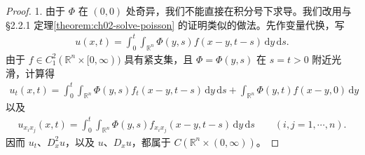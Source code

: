 \documentclass[../../main.tex]{subfiles}
\begin{document}
\begin{proof}
1. 由于 $\Phi$ 在 $(0,0)$ 处奇异，我们不能直接在积分号下求导。我们改用与 \S2.2.1 定理\cref{theorem:ch02-solve-poisson} 的证明类似的做法。先作变量代换，写
\begin{align*}
u(x,t)=\int_0^t\int_{\mathbb{R}^n}\Phi(y,s)f(x-y,t-s)\,\mathrm{d}y\,\mathrm{d}s.
\end{align*}
由于 $f\in C^2_1(\mathbb{R}^n\times[0,\infty))$ 具有紧支集，且 $\Phi=\Phi(y,s)$ 在 $s=t>0$ 附近光滑，计算得
\begin{align*}
u_t(x,t)=\int_0^t\int_{\mathbb{R}^n}\Phi(y,s)f_t(x-y,t-s)\,\mathrm{d}y\,\mathrm{d}s
+\int_{\mathbb{R}^n}\Phi(y,t)f(x-y,0)\,\mathrm{d}y
\end{align*}
以及
\begin{align*}
u_{x_i x_j}(x,t)=\int_0^t\int_{\mathbb{R}^n}\Phi(y,s)f_{x_i x_j}(x-y,t-s)\,\mathrm{d}y\,\mathrm{d}s \qquad (i,j=1,\cdots,n).
\end{align*}
因而 $u_t$、$D_x^2u$，以及 $u$、$D_xu$，都属于 $C(\mathbb{R}^n\times(0,\infty))$。


\end{proof}
\end{document}
